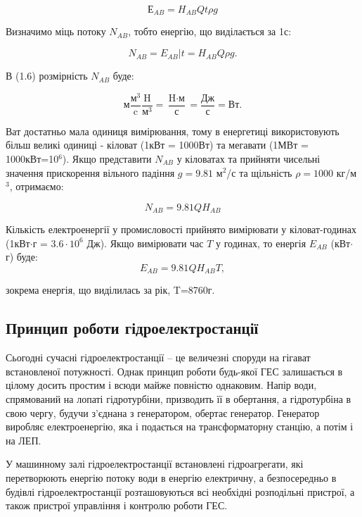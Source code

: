 \documentclass[12pt]{article}
\numberwithin{equation}{section}
\numberwithin{figure}{section}
\begin{document}
\begin{equation}\label{eq:5}
Е_{AB} = H_{AB} Qt\rho g
\end{equation}

Визначимо міць потоку $N_{AB}$, тобто енергію, що виділається за 1с:

\begin{equation}\label{eq:6}
N_{AB}=E_{AB}|t = H_{AB}Q\rho g.
\end{equation}

В (1.6) розмірність $N_{AB}$ буде:

\[
\text{м}\frac{\text{м}^3}{\text{c}}\frac{\text{H}}{\text{м}^3} = \frac{\text{H}\cdot \text{м}}{\text{с}} = \frac{\text{Дж}}{\text{с}} = \text{Вт}.
\]

Ват достатньо мала одиниця вимірювання, тому в енергетиці використовують більш великі одиниці - кіловат (1кВт = 1000Вт) та мегавати (1МВт = 1000кВт=10$^6$). Якщо представити $N_{AB}$ у кіловатах та прийняти чисельні значення прискорення вільного падіння $g=9.81$ м$^2$/с та щільність $\rho = 1000$ кг/м$^3$, отримаємо:

\begin{equation}\label{eq:7}
N_{AB}=9.81QH_{AB}
\end{equation}

Кількість електроенергії у промисловості прийнято вимірювати у кіловат-годинах (1кВт$\cdot$г = $3.6\cdot 10^6$ Дж). Якщо вимірювати час $T$ у годинах, то енергія $E_{AB}$ (кВт$\cdot$г) буде:
$$
E_{AB} = 9.81QH_{AB}T,
$$

зокрема енергія, що виділилась за рік, T=8760г.

\subsection{Принцип роботи гідроелектростанції}

 Сьогодні сучасні гідроелектростанції – це величезні споруди на гігават встановленої потужності. Однак принцип роботи будь-якої ГЕС залишається в цілому досить простим і всюди майже повністю однаковим. Напір води, спрямований на лопаті гідротурбіни, призводить її в обертання, а гідротурбіна в свою чергу, будучи з’єднана з генератором, обертає генератор. Генератор виробляє електроенергію, яка і подається на трансформаторну станцію, а потім і на ЛЕП.
 
 У машинному залі гідроелектростанції встановлені гідроагрегати, які перетворюють енергію потоку води в енергію електричну, а безпосередньо в будівлі гідроелектростанції розташовуються всі необхідні розподільні пристрої, а також пристрої управління і контролю роботи ГЕС.
\end{document}
